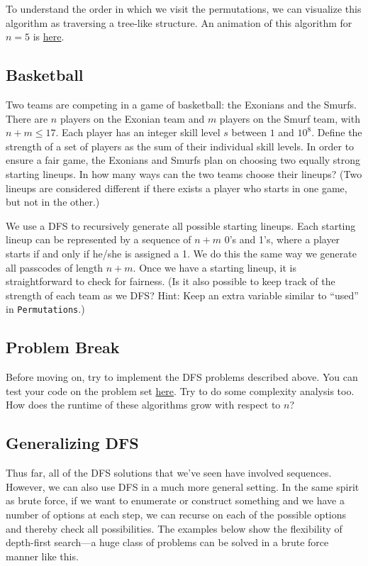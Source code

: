 To understand the order in which we visit the permutations, we can visualize this algorithm as traversing a tree-like structure. An animation of this algorithm for $n = 5$ is \href{http://dabbler0.github.io/ecc-animations/dfs.html}{here}.

\subsection{Basketball}

\begin{typewriter}
Two teams are competing in a game of basketball: the Exonians and the Smurfs. There are $n$ players on the Exonian team and $m$ players on the Smurf team, with $n + m \le 17$. Each player has an integer skill level $s$ between $1$ and $10^8$. Define the strength of a set of players as the sum of their individual skill levels. In order to ensure a fair game, the Exonians and Smurfs plan on choosing two equally strong starting lineups. In how many ways can the two teams choose their lineups? (Two lineups are considered different if there exists a player who starts in one game, but not in the other.)
\end{typewriter}

We use a DFS to recursively generate all possible starting lineups. Each starting lineup can be represented by a sequence of $n + m$ 0's and 1's, where a player starts if and only if he/she is assigned a 1. We do this the same way we generate all passcodes of length $n + m$. Once we have a starting lineup, it is straightforward to check for fairness. (Is it also possible to keep track of the strength of each team as we DFS? Hint: Keep an extra variable similar to ``used'' in \texttt{Permutations}.)

\subsection{Problem Break}

Before moving on, try to implement the DFS problems described above. You can test your code on the problem set \href{http://codeforces.com/group/iMPx86rZXm/contest/205012}{here}. Try to do some complexity analysis too. How does the runtime of these algorithms grow with respect to $n$?

\subsection{Generalizing DFS}

Thus far, all of the DFS solutions that we've seen have involved sequences. However, we can also use DFS in a much more general setting. In the same spirit as brute force, if we want to enumerate or construct something and we have a number of options at each step, we can recurse on each of the possible options and thereby check all possibilities. The examples below show the flexibility of depth-first search---a huge class of problems can be solved in a brute force manner like this.

